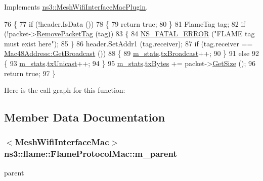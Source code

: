 Implements \hyperlink{classns3_1_1MeshWifiInterfaceMacPlugin_af14bbe6ab750951c0291b0e4144d2caf}{ns3\+::\+Mesh\+Wifi\+Interface\+Mac\+Plugin}.


\begin{DoxyCode}
76 \{
77   \textcolor{keywordflow}{if} (!header.IsData ())
78     \{
79       \textcolor{keywordflow}{return} \textcolor{keyword}{true};
80     \}
81   FlameTag tag;
82   \textcolor{keywordflow}{if} (!packet->\hyperlink{classns3_1_1Packet_a078fe922d976a417ab25ba2f3c2fd667}{RemovePacketTag} (tag))
83     \{
84       \hyperlink{group__fatal_ga5131d5e3f75d7d4cbfd706ac456fdc85}{NS\_FATAL\_ERROR} (\textcolor{stringliteral}{"FLAME tag must exist here"});
85     \}
86   header.SetAddr1 (tag.receiver);
87   \textcolor{keywordflow}{if} (tag.receiver == \hyperlink{classns3_1_1Mac48Address_a55156e302c6bf950c0b558365adbde84}{Mac48Address::GetBroadcast} ())
88     \{
89       \hyperlink{classns3_1_1flame_1_1FlameProtocolMac_a57bb890f13b6f1733587ce706368c037}{m\_stats}.\hyperlink{structns3_1_1flame_1_1FlameProtocolMac_1_1Statistics_a623867ef050869878f117b897c84ad3c}{txBroadcast}++;
90     \}
91   \textcolor{keywordflow}{else}
92     \{
93       \hyperlink{classns3_1_1flame_1_1FlameProtocolMac_a57bb890f13b6f1733587ce706368c037}{m\_stats}.\hyperlink{structns3_1_1flame_1_1FlameProtocolMac_1_1Statistics_a536fc0b2aeb6ac3d81221a6ed9ca07e2}{txUnicast}++;
94     \}
95   \hyperlink{classns3_1_1flame_1_1FlameProtocolMac_a57bb890f13b6f1733587ce706368c037}{m\_stats}.\hyperlink{structns3_1_1flame_1_1FlameProtocolMac_1_1Statistics_a66c4802b2e3e3f367de9b842e36d9536}{txBytes} += packet->\hyperlink{classns3_1_1Packet_a462855c9929954d4301a4edfe55f4f1c}{GetSize} ();
96   \textcolor{keywordflow}{return} \textcolor{keyword}{true};
97 \}
\end{DoxyCode}


Here is the call graph for this function\+:




\subsection{Member Data Documentation}
\subsubsection[{\texorpdfstring{m\+\_\+parent}{m_parent}}]{$<${\bf Mesh\+Wifi\+Interface\+Mac}$>$ ns3\+::flame\+::\+Flame\+Protocol\+Mac\+::m\+\_\+parent\hspace{0.3cm}{\ttfamily [private]}}\hypertarget{classns3_1_1flame_1_1FlameProtocolMac_ab9edb48e67ad1f87f583bd8aecffa6fe}{}\label{classns3_1_1flame_1_1FlameProtocolMac_ab9edb48e67ad1f87f583bd8aecffa6fe}
parent 
